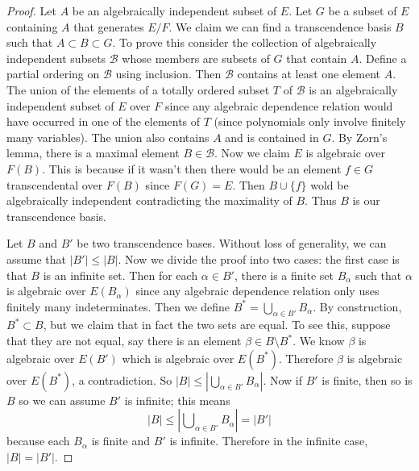 \begin{proof}
Let $A$ be an algebraically independent subset of $E$. Let $G$ be a subset
of $E$ containing $A$ that generates $E/F$. We claim we can find a
transcendence basis $B$ such that $A \subset B \subset G$.
To prove this consider the collection of algebraically independent subsets
$\mathcal{B}$ whose members are subsets of $G$ that contain $A$.
Define a partial ordering on $\mathcal{B}$ using inclusion.
Then $\mathcal{B}$ contains at least one element $A$.
The union of the elements of a totally ordered subset $T$ of $\mathcal{B}$
is an algebraically independent subset of $E$ over $F$ since any algebraic
dependence relation would have occurred in one of the elements of $T$
(since polynomials only involve finitely many variables). The union also
contains $A$ and is contained in $G$. By Zorn's lemma, there is a maximal
element $B \in \mathcal{B}$. Now we claim $E$ is algebraic over $F(B)$.
This is because if it wasn't then there would be an element
$f \in G$ transcendental over $F(B)$ since $F(G) = E$. Then
$B \cup\{f\}$ wold be algebraically independent contradicting the
maximality of $B$. Thus $B$ is our transcendence basis.

\medskip\noindent
Let $B$ and $B'$ be two transcendence bases. Without loss of generality, we
can assume that $|B'| \leq |B|$. Now we divide the proof into two cases: the
first case is that $B$ is an infinite set. Then for each $\alpha \in B'$,
there is a finite set $B_{\alpha}$ such that $\alpha$ is algebraic over
$E(B_{\alpha})$ since any algebraic dependence relation only uses finitely many
indeterminates. Then we define $B^* = \bigcup_{\alpha\in B'} B_{\alpha}$.
By construction, $B^* \subset B$, but we claim that in fact the two sets are
equal. To see this, suppose that they are not equal, say there is an element
$\beta \in B \setminus B^*$. We know $\beta$ is algebraic over $E(B')$ which
is algebraic over $E(B^*)$. Therefore $\beta$ is algebraic over $E(B^*)$, a
contradiction. So $|B| \leq |\bigcup_{\alpha \in B'} B_{\alpha}|$.
Now if $B'$ is finite, then so is $B$ so we can assume $B'$ is infinite;
this means
$$
|B| \leq |\bigcup\nolimits_{\alpha \in B'} B_{\alpha}| = |B'|
$$
because each $B_\alpha$ is finite and $B'$ is infinite. Therefore in the
infinite case, $|B| = |B'|$.


\end{proof}
